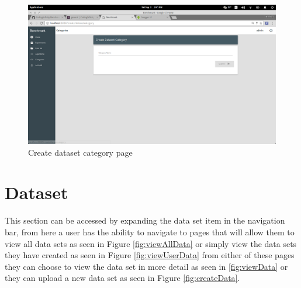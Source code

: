 \documentclass[11pt,a4paper]{article}
\begin{document}
\begin{figure}[H]
	\begin{center}
		\includegraphics[scale=0.3]{../Images/User Manual/Create Dataset Category.png}
		\caption{Create dataset category page}
		\label{fig:createDataCat}
	\end{center}  
\end{figure}

\section{Dataset}
This section can be accessed by expanding the data set item in the navigation bar, from
here a user has the ability to navigate to pages that will allow them to view all data
sets as seen in Figure \ref{fig:viewAllData} or simply view the data sets they have
created as seen in Figure \ref{fig:viewUserData} from either of these pages they can choose
to view the data set in more detail as seen in \ref{fig:viewData} or they can upload a new
data set as seen in Figure \ref {fig:createData}.
\end{document}
